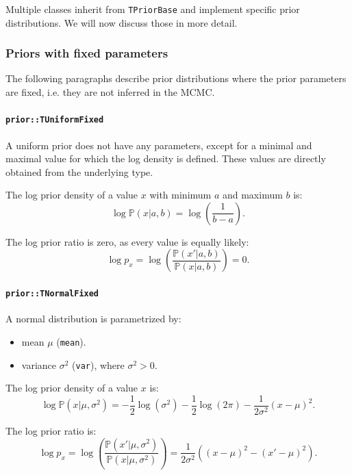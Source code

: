 \documentclass[a4paper,11pt]{article}
\def\p{\mathbb{P}}
\newcommand{\class}[1]{\texttt{#1}}
\newcommand{\privparam}[1]{\texttt{\textunderscore #1}}
\begin{document}
Multiple classes inherit from \class{TPriorBase} and implement specific prior distributions. We will now discuss those in more detail.

\subsubsection{Priors with fixed parameters}

The following paragraphs describe prior distributions where the prior parameters are fixed, i.e. they are not inferred in the MCMC.
\paragraph{\class{prior::TUniformFixed}}
A uniform prior does not have any parameters, except for a minimal and maximal value for which the log density is defined. These values are directly obtained from the underlying type.

The log prior density of a value $x$ with minimum $a$ and maximum $b$ is:
\begin{equation*}
 \log \p(x|a, b) = \log\left(\frac{1}{b-a}\right).
\end{equation*}

The log prior ratio is zero, as every value is equally likely:
\begin{equation*}
 \log p_x = \log \left( \frac{\p(x'|a, b)}{\p(x|a, b)} \right) = 0.
\end{equation*}

\paragraph{\class{prior::TNormalFixed}}

A normal distribution is parametrized by:
\begin{itemize}
 \item mean $\mu$ (\privparam{mean}).
 \item variance $\sigma^2$ (\privparam{var}), where $\sigma^2 > 0$.
\end{itemize}

The log prior density of a value $x$ is:
\begin{equation}\label{eq:priorDensNormal}
 \log \p(x|\mu, \sigma^2) = -\frac{1}{2}\log(\sigma^2) - \frac{1}{2}\log(2\pi) - \frac{1}{2\sigma^2}(x - \mu)^2.
\end{equation}

The log prior ratio is:
\begin{equation}\label{eq:priorRatioNormal}
 \log p_x = \log \left( \frac{\p(x'|\mu, \sigma^2)}{\p(x|\mu, \sigma^2)} \right) =  \frac{1}{2\sigma^2}\left((x - \mu)^2 - (x' - \mu)^2\right).
\end{equation}
\end{document}
